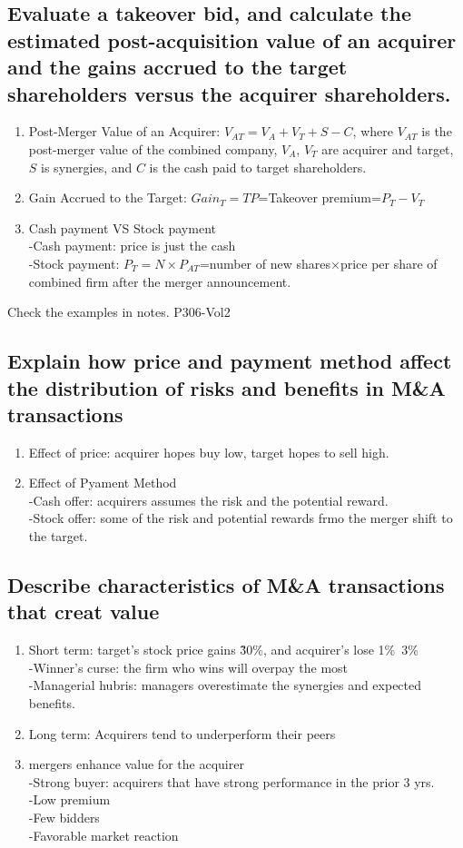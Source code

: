 \documentclass{article}
\newcommand{\be}{\begin{enumerate}}
\newcommand{\ee}{\end{enumerate}}
\begin{document}
\subsection{Evaluate a takeover bid, and calculate the estimated post-acquisition
value of an acquirer and the gains accrued to the target shareholders versus the
acquirer shareholders.}
\be
    \item Post-Merger Value of an Acquirer: $V_{AT}=V_{A}+V_T+S-C$, where 
        $V_{AT}$ is the post-merger value of the combined company, $V_A$, $V_T$ are
        acquirer and target, $S$ is synergies, and $C$ is the cash paid to target
        shareholders.
    \item Gain Accrued to the Target: $Gain_T=TP$=Takeover premium=$P_T-V_T$
    \item Cash payment VS Stock payment
        \\-Cash payment: price is just the cash
        \\-Stock payment: $P_T=N\times P_{AT}$=number of new shares$\times$price 
        per share of combined firm after the merger announcement.
\ee
Check the examples in notes. P306-Vol2
\subsection{Explain how price and payment method affect the distribution of risks and benefits 
in M\&A transactions}
\be
    \item Effect of price: acquirer hopes buy low, target hopes to sell high.
    \item Effect of Pyament Method
        \\-Cash offer: acquirers assumes the risk and the potential reward.
        \\-Stock offer: some of the risk and potential rewards frmo the
        merger shift to the target.
\ee
\subsection{Describe characteristics of M\&A transactions that creat value}
\be
    \item Short term: target's stock price gains \~30\%, and acquirer's lose 1\%~3\%
        \\-Winner's curse: the firm who wins will overpay the most
        \\-Managerial hubris: managers overestimate the synergies and expected benefits.
    \item Long term: Acquirers tend to underperform their peers
    \item mergers enhance value for the acquirer
        \\-Strong buyer: acquirers that have strong performance in the prior 3 yrs.
        \\-Low premium
        \\-Few bidders
        \\-Favorable market reaction
\ee
\end{document}
